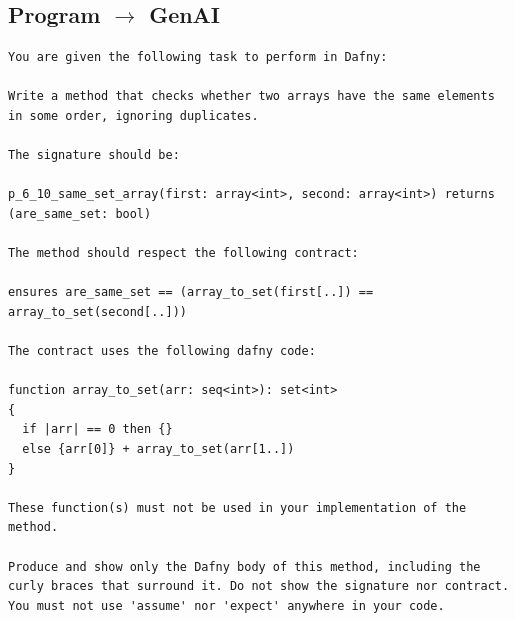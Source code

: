\documentclass{article}
\begin{document}
\subsection*{Program $\rightarrow$ GenAI}
\begin{lstlisting}
You are given the following task to perform in Dafny:

Write a method that checks whether two arrays have the same elements in some order, ignoring duplicates.

The signature should be:

p_6_10_same_set_array(first: array<int>, second: array<int>) returns (are_same_set: bool)

The method should respect the following contract:

ensures are_same_set == (array_to_set(first[..]) == array_to_set(second[..]))

The contract uses the following dafny code:

function array_to_set(arr: seq<int>): set<int>
{
  if |arr| == 0 then {}
  else {arr[0]} + array_to_set(arr[1..])
}

These function(s) must not be used in your implementation of the method.

Produce and show only the Dafny body of this method, including the curly braces that surround it. Do not show the signature nor contract. You must not use 'assume' nor 'expect' anywhere in your code.
\end{lstlisting}
\end{document}
